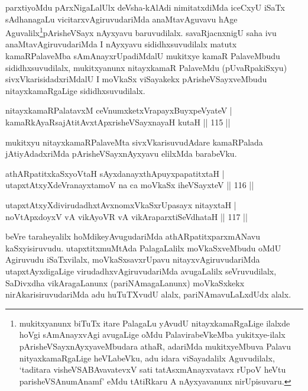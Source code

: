 \begin{artha}
parxtiyoMdu pArxNigaLalUlx deVsha-kAlAdi nimitatxdiMda iceCxyU iSaTx sAdhanagaLu vicitarxvAgiruvudariMda anaMtavAguvavu hAge Aguvalilx\footnote{mukitxyanunx biTuTx itare PalagaLu yAvudU nitayxkamaRgaLige ilalxde hoVgi sAmAnayxvAgi avugaLige oMdu PalavirabeVkeMba yukitxye-ilalx pArisheVSayxnAyxyaveMbudara athaR, adariMda mukitxyeMbuva Palavu nityaxkamaRgaLige heVLabeVku, adu idara viSayadalilx Aguvudilalx, `taditara visheVSABAvavatevxV sati tatAsxmAnayxvatavx rUpoV heVtu parisheVSAnumAnamf' eMdu tAtiRkaru A nAyxyavanunx nirUpisuvaru.}pArisheVSayx nAyxyavu baruvudilalx. savaRjacnxnigU saha ivu anaMtavAgiruvudariMda I nAyxyavu sididhxsuvudilalx matutx kamaRPalaveMba sAmAnayxrUpadiMdalU mukitxye kamaR PalaveMbudu sididhxsuvudilalx, mukitxyanunx nitayxkamaR PalaveMdu (pUvaRpakiSxyu) sivxVkarisidadxriMdalU I moVkaSx viSayakekx pArisheVSayxveMbudu nitayxkamaRgaLige sididhxsuvudilalx.
\end{artha}

\begin{shl}
nitayxkamaRPalatavxM ceVnumxketxVrapayxBuyxpeVyateV |\\
kamaRkAyaRsajAtitAvxtApxrisheVSayxnayaH kutaH \hfill || 115 ||
\end{shl}

\begin{artha}
mukitxyu nitayxkamaRPalaveMta sivxVkarisuvudAdare kamaRPalada jAtiyAdadxriMda pArisheVSayxnAyxyavu elilxMda barabeVku.
\end{artha}

\begin{shl}
athARpatitxkaSxyoV\s taH sAyxdanayxthA\s puyxpapatitxtaH |\\
utapxtAtxyXdeVranayxtamoV na ca moVkaSx iheVSayxteV \hfill || 116 ||
\end{shl}

\begin{shl}
utapxtAtxyXdivirudadhxtAvxnomxVkaSxrUpasayx nitayxtaH |\\
noVtApxdoyxV vA vikAyoVR vA vikAraparxtiSeVdhataH \hfill || 117 ||
\end{shl}

\begin{artha}
beVre taraheyalilx hoMdikeyAvugudariMda athARpatitxparxmANavu kaSxyisiruvudu. utapxtitxmuMtAda PalagaLalilx moVkaSxveMbudu oMdU Agiruvudu iSaTxvilalx, moVkaSxsavxrUpavu nitayxvAgiruvudariMda utapxtAyxdigaLige virudadhxvAgiruvudariMda avugaLalilx seVruvudilalx, SaDivxdha vikAragaLanunx (pariNAmagaLanunx) moVkaSxkekx nirAkarisiruvudariMda adu huTuTXvudU alalx, pariNAmavuLaLxdUdx alalx.
\end{artha}


